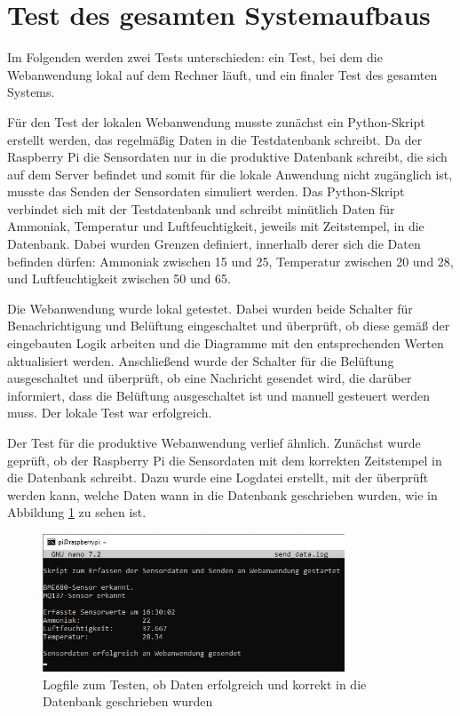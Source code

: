 \documentclass[conference]{IEEEtran}
\begin{document}
\section{Test des gesamten Systemaufbaus}
Im Folgenden werden zwei Tests unterschieden: ein Test, bei dem die Webanwendung lokal auf dem Rechner läuft, und ein finaler Test des gesamten Systems.

Für den Test der lokalen Webanwendung musste zunächst ein Python-Skript erstellt werden, das regelmäßig Daten in die Testdatenbank schreibt. Da der Raspberry Pi die Sensordaten nur in die produktive Datenbank schreibt, die sich auf dem Server befindet und somit für die lokale Anwendung nicht zugänglich ist, musste das Senden der Sensordaten simuliert werden. Das Python-Skript verbindet sich mit der Testdatenbank und schreibt minütlich Daten für Ammoniak, Temperatur und Luftfeuchtigkeit, jeweils mit Zeitstempel, in die Datenbank. Dabei wurden Grenzen definiert, innerhalb derer sich die Daten befinden dürfen: Ammoniak zwischen 15 und 25, Temperatur zwischen 20 und 28, und Luftfeuchtigkeit zwischen 50 und 65.

Die Webanwendung wurde lokal getestet. Dabei wurden beide Schalter für Benachrichtigung und Belüftung eingeschaltet und überprüft, ob diese gemäß der eingebauten Logik arbeiten und die Diagramme mit den entsprechenden Werten aktualisiert werden. Anschließend wurde der Schalter für die Belüftung ausgeschaltet und überprüft, ob eine Nachricht gesendet wird, die darüber informiert, dass die Belüftung ausgeschaltet ist und manuell gesteuert werden muss. Der lokale Test war erfolgreich.

Der Test für die produktive Webanwendung verlief ähnlich. Zunächst wurde geprüft, ob der Raspberry Pi die Sensordaten mit dem korrekten Zeitstempel in die Datenbank schreibt. Dazu wurde eine Logdatei erstellt, mit der überprüft werden kann, welche Daten wann in die Datenbank geschrieben wurden, wie in Abbildung \ref{testdatasensor} zu sehen ist.


\begin{figure}[H]
	\centering
	\includegraphics[width=90mm]{fig/datasensorlog.png}
	\caption{Logfile zum Testen, ob Daten erfolgreich und korrekt in die Datenbank geschrieben wurden}
	\label{testdatasensor}
\end{figure}
\end{document}
